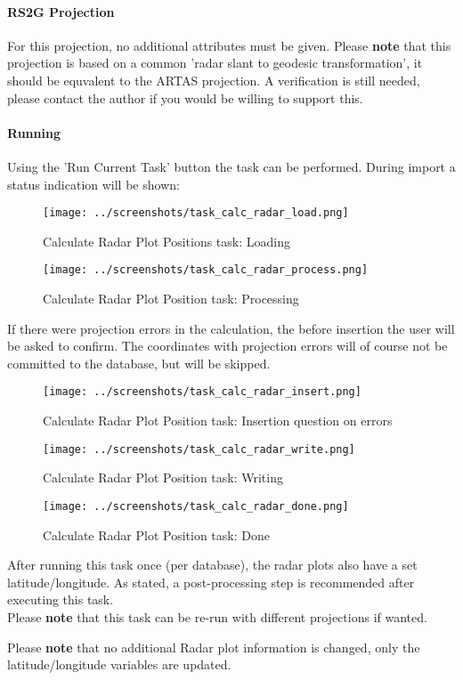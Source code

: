 \paragraph{RS2G Projection}

For this projection, no additional attributes must be given. Please \textbf{note} that this projection is based on a common 'radar slant to geodesic transformation', it should be equvalent to the ARTAS projection. A verification is still needed, please contact the author if you would be willing to support this.

\paragraph{Running}

Using the 'Run Current Task' button the task can be performed. During import a status indication will be shown:

\begin{figure}[H]
  \center
    \texttt{[image: ../screenshots/task\_calc\_radar\_load.png]}
  \caption{Calculate Radar Plot Positions task: Loading}
\end{figure}

\begin{figure}[H]
  \center
    \texttt{[image: ../screenshots/task\_calc\_radar\_process.png]}
  \caption{Calculate Radar Plot Position task: Processing}
\end{figure}

If there were projection errors in the calculation, the before insertion the user will be asked to confirm. The coordinates with projection errors will of course not be committed to the database, but will be skipped.

\begin{figure}[H]
  \center
    \texttt{[image: ../screenshots/task\_calc\_radar\_insert.png]}
  \caption{Calculate Radar Plot Position task: Insertion question on errors}
\end{figure}


\begin{figure}[H]
  \center
    \texttt{[image: ../screenshots/task\_calc\_radar\_write.png]}
  \caption{Calculate Radar Plot Position task: Writing}
\end{figure}

\begin{figure}[H]
  \center
    \texttt{[image: ../screenshots/task\_calc\_radar\_done.png]}
  \caption{Calculate Radar Plot Position task: Done}
\end{figure}

After running this task once (per database), the radar plots also have a set latitude/longitude. As stated, a post-processing step is recommended after executing this task. \\

Please \textbf{note} that this task can be re-run with different projections if wanted.

Please \textbf{note} that no additional Radar plot information is changed, only the latitude/longitude variables are updated. 
